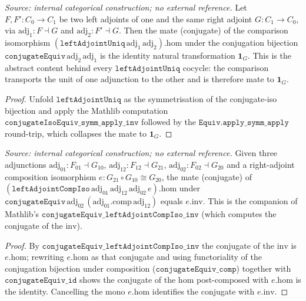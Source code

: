 \begin{lemma}\leanok
  \label{lem:conjugate_equiv_leftadjointuniq_hom}
  \textit{Source: internal categorical construction; no external reference.}
  Let \(F, F' : C_0 \to C_1\) be two left adjoints of one and the same right adjoint
  \(G : C_1 \to C_0\), via \(\mathrm{adj}_1 : F \dashv G\) and \(\mathrm{adj}_2 : F' \dashv G\). Then the
  mate (conjugate) of the comparison isomorphism \((\mathtt{leftAdjointUniq}\,\mathrm{adj}_1\,\mathrm{adj}_2).\mathrm{hom}\)
  under the conjugation bijection \(\mathtt{conjugateEquiv}\,\mathrm{adj}_2\,\mathrm{adj}_1\) is the identity
  natural transformation \(\mathbf{1}_G\). This is the abstract content behind every
  \(\mathtt{leftAdjointUniq}\) cocycle: the comparison transports the unit of one adjunction to the
  other and is therefore mate to \(\mathbf{1}_G\).
\end{lemma}
\begin{proof}


\leanok
  Unfold \(\mathtt{leftAdjointUniq}\) as the symmetrisation of the conjugate-iso bijection and apply the
  Mathlib computation \(\mathtt{conjugateIsoEquiv\_symm\_apply\_inv}\) followed by the
  \(\mathtt{Equiv.apply\_symm\_apply}\) round-trip, which collapses the mate to \(\mathbf{1}_G\).
\end{proof}

\begin{lemma}\leanok
  \label{lem:conjugate_equiv_leftadjointcompiso_hom}
  \textit{Source: internal categorical construction; no external reference.}
  Given three adjunctions \(\mathrm{adj}_{01} : F_{01} \dashv G_{10}\),
  \(\mathrm{adj}_{12} : F_{12} \dashv G_{21}\), \(\mathrm{adj}_{02} : F_{02} \dashv G_{20}\) and a
  right-adjoint composition isomorphism \(e : G_{21} \circ G_{10} \cong G_{20}\), the mate (conjugate)
  of \((\mathtt{leftAdjointCompIso}\,\mathrm{adj}_{01}\,\mathrm{adj}_{12}\,\mathrm{adj}_{02}\,e).\mathrm{hom}\)
  under \(\mathtt{conjugateEquiv}\,\mathrm{adj}_{02}\,(\mathrm{adj}_{01}.\mathrm{comp}\,\mathrm{adj}_{12})\)
  equals \(e.\mathrm{inv}\). This is the companion of Mathlib's
  \(\mathtt{conjugateEquiv\_leftAdjointCompIso\_inv}\) (which computes the conjugate of the \(\mathrm{inv}\)).
\end{lemma}
\begin{proof}


\leanok
  By \(\mathtt{conjugateEquiv\_leftAdjointCompIso\_inv}\) the conjugate of the \(\mathrm{inv}\) is
  \(e.\mathrm{hom}\); rewriting \(e.\mathrm{hom}\) as that conjugate and using functoriality of the
  conjugation bijection under composition (\(\mathtt{conjugateEquiv\_comp}\)) together with
  \(\mathtt{conjugateEquiv\_id}\) shows the conjugate of the \(\mathrm{hom}\) post-composed with
  \(e.\mathrm{hom}\) is the identity. Cancelling the mono \(e.\mathrm{hom}\) identifies the conjugate
  with \(e.\mathrm{inv}\).
\end{proof}

